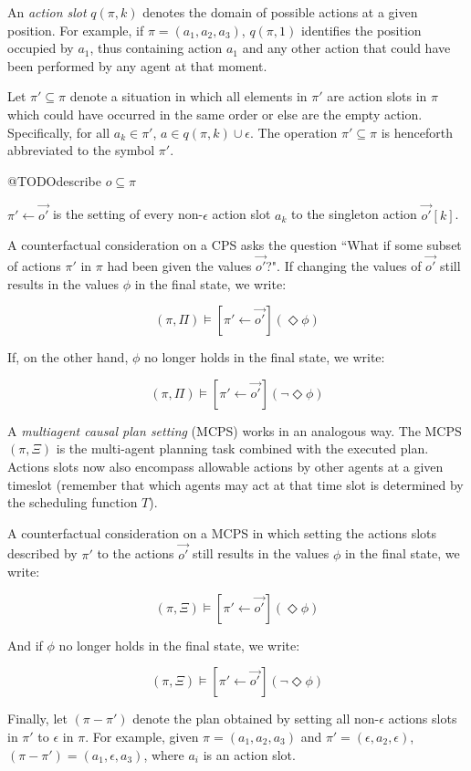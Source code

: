 \documentclass{article}
\theoremstyle{plain}
\theoremstyle{definition}
\begin{document}
An \textit{action slot} $q(\pi,k)$ denotes the domain of possible actions at a given position. For example, if $\pi=(a_1,a_2,a_3)$, $q(\pi,1)$ identifies the position occupied by $a_1$, thus containing action $a_1$ and any other action that could have been performed by any agent at that moment.

Let $\pi'\subseteq \pi$ denote a situation in which all elements in $\pi'$ are action slots in $\pi$ which could have occurred in the same order or else are the empty action. Specifically, for all $a_k \in \pi'$, $a \in q(\pi,k) \cup \epsilon$. The operation $\pi'\subseteq \pi$ is henceforth abbreviated to the symbol $\pi'$.

@TODOdescribe $o \subseteq \pi$

$\pi' \leftarrow \vec{o'}$ is the setting of every non-$\epsilon$ action slot $a_k$ to the singleton action $\vec{o'}[k]$.


A counterfactual consideration on a CPS asks the question ``What if some subset of actions $\pi'$ in $\pi$ had been given the values $\vec{o'}$?". If changing the values of $\vec{o'}$ still results in the values $\phi$ in the final state, we write:

\[
(\pi, \Pi) \models [\pi' \leftarrow \vec{o'}](\Diamond \phi)
\]

If, on the other hand, $\phi$ no longer holds in the final state, we write:

\[
(\pi, \Pi) \models [\pi' \leftarrow \vec{o'}](\lnot \Diamond \phi)
\]


A \textit{multiagent causal plan setting} (MCPS) works in an analogous way. The MCPS $(\pi,\Xi)$ is the multi-agent planning task combined with the executed plan. Actions slots now also encompass allowable actions by other agents at a given timeslot (remember that which agents may act at that time slot is determined by the scheduling function $T$).

A counterfactual consideration on a MCPS in which setting the actions slots described by $\pi'$ to the actions $\vec{o'}$ still results in the values $\phi$ in the final state, we write:

\[
(\pi, \Xi) \models [\pi' \leftarrow \vec{o'}](\Diamond \phi)
\]

And if $\phi$ no longer holds in the final state, we write:

\[
(\pi, \Xi) \models [\pi' \leftarrow \vec{o'}](\lnot \Diamond \phi)
\]

Finally, let $(\pi-\pi')$ denote the plan obtained by setting all non-$\epsilon$ actions slots in $\pi'$ to $\epsilon$ in $\pi$. For example, given $\pi=(a_1,a_2,a_3)$ and $\pi'=(\epsilon, a_2, \epsilon)$, $(\pi-\pi')=(a_1, \epsilon, a_3)$, where $a_i$ is an action slot.
\end{document}
